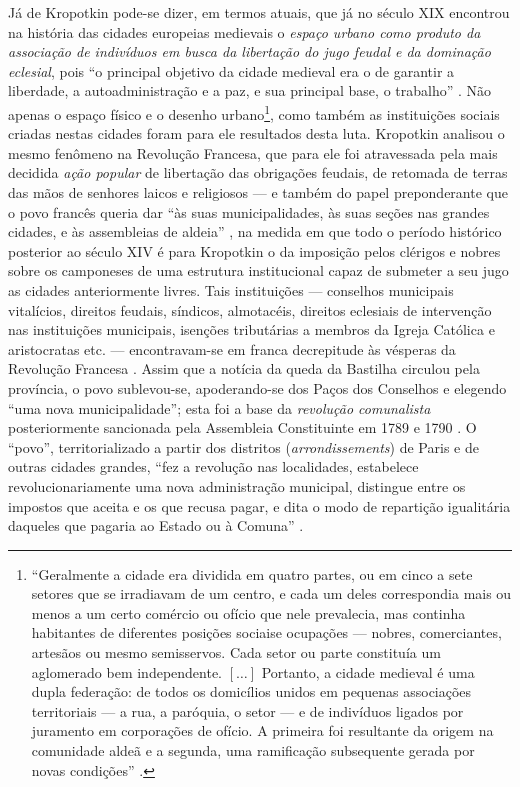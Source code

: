 Já de Kropotkin pode-se dizer, em termos atuais, que já no século XIX encontrou na história das cidades europeias medievais o \textit{espaço urbano como produto da associação de indivíduos em busca da libertação do jugo feudal e da dominação eclesial}, pois ``o principal objetivo da cidade medieval era o de garantir a liberdade, a autoadministração e a paz, e sua principal base, o trabalho'' \cite[p.~142]{KROPOTKIN2009}. Não apenas o espaço físico e o desenho urbano\footnote{``Geralmente a cidade era dividida em quatro partes, ou em cinco a sete setores que se irradiavam de um centro, e cada um deles correspondia  mais ou menos a um certo comércio ou ofício que nele prevalecia, mas continha habitantes de diferentes posições sociaise ocupações --- nobres, comerciantes, artesãos ou mesmo semisservos. Cada setor ou parte constituía um aglomerado bem independente. \([\dots]\) Portanto, a cidade medieval é uma dupla federação: de todos os domicílios unidos em pequenas associações territoriais --- a rua, a paróquia, o setor --- e de indivíduos ligados por juramento em corporações de ofício. A primeira foi resultante da origem na comunidade aldeã e a segunda, uma ramificação subsequente gerada por novas condições'' \cite[p.~142]{KROPOTKIN2009}.}, como também as instituições sociais criadas nestas cidades foram para ele resultados desta luta. Kropotkin analisou o mesmo fenômeno na Revolução Francesa, que para ele foi atravessada pela mais decidida \textit{ação popular} de libertação das obrigações feudais, de retomada de terras das mãos de senhores laicos e religiosos --- e também do papel preponderante que o povo francês queria dar ``às suas municipalidades, às suas seções nas grandes cidades, e às assembleias de aldeia'' \cite[p.~23]{KROPOTKIN1955}, na medida em que todo o período histórico posterior ao século XIV é para Kropotkin o da imposição pelos clérigos e nobres sobre os camponeses de uma estrutura institucional capaz de submeter a seu jugo as cidades anteriormente livres. Tais instituições --- conselhos municipais vitalícios, direitos feudais, síndicos, almotacéis, direitos eclesiais de intervenção nas instituições municipais, isenções tributárias a membros da Igreja Católica e aristocratas etc. --- encontravam-se em franca decrepitude às vésperas da Revolução Francesa \cite[pp.~118-120]{KROPOTKIN1955}. Assim que a notícia da queda da Bastilha circulou pela província, o povo sublevou-se, apoderando-se dos Paços dos Conselhos e elegendo  ``uma nova municipalidade''; esta foi a base da \textit{revolução comunalista }posteriormente sancionada pela Assembleia Constituinte em 1789 e 1790 \cite[pp.~121]{KROPOTKIN1955}. O ``povo'', territorializado a partir dos distritos (\textit{arrondissements}) de Paris e de outras cidades grandes, ``fez a revolução nas localidades, estabelece revolucionariamente uma nova administração municipal, distingue entre os impostos que aceita e os que recusa pagar, e dita o modo de repartição igualitária daqueles que pagaria ao Estado ou à Comuna'' \cite[p.~130]{KROPOTKIN1955}.

